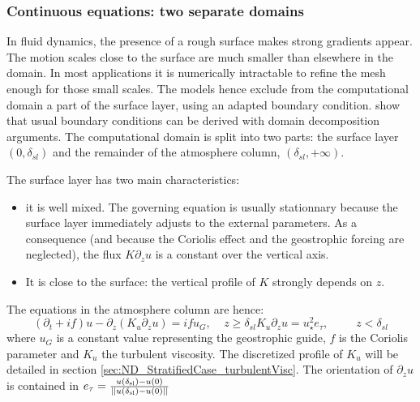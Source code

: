 \subsubsection{Continuous equations: two separate domains}
In fluid dynamics, the presence of a rough surface makes strong
gradients appear.
The motion scales close to the surface are much smaller than
elsewhere in the domain. In most applications it is numerically
intractable to refine the mesh enough for those small scales.
The models hence exclude from the computational domain
a part of the surface layer, using an adapted boundary
condition. \cite{mohammadi_rough_1998} show that usual boundary
conditions can be derived with domain decomposition arguments.
%
The computational domain is split into two parts:
the surface layer $(0,\delta_{sl})$ and the remainder of
the atmosphere column, $(\delta_{sl}, +\infty)$.
%
\par
The surface layer has two main characteristics:
\begin{itemize}
	\item it is well mixed. The governing equation
		is usually stationnary because the surface layer
		immediately adjusts to the external parameters.
		As a consequence (and because the Coriolis effect
		and the geostrophic forcing are neglected),
		the flux $K \partial_z u$
		is a constant over the vertical axis.
	\item It is close to the surface:
		the vertical profile of $K$ strongly depends 
		on $z$.
\end{itemize}
The equations in the atmosphere column are hence:
\begin{subequations}
	\label{eq:ND_NeutralCase_continuousModel}
	\begin{equation}
	\label{eq:ND_NeutralCase_EkmanEq}
  (\partial_t + if) u - \partial_z (K_u \partial_z u) = if u_G
		,~~~~~ z \geq \delta_{sl}
	\end{equation}
	\begin{equation}
	\label{eq:ND_NeutralCase_ConstantFlux}
	K_u \partial_z u
	= u_\star^2
	e_\tau, ~~~~~~~~~~~ z < \delta_{sl}
	\end{equation}
\end{subequations}
where $u_G$ is a constant value representing the geostrophic guide,
$f$ is the Coriolis parameter and $K_u$ the turbulent viscosity.
The discretized profile of $K_u$ will be
detailed in section \ref{sec:ND_StratifiedCase_turbulentVisc}.
The orientation of $\partial_z u$ is contained in
$e_\tau = \frac{u(\delta_{\rm sl})-u(0)}
	{||u(\delta_{\rm sl})-u(0)||}$
